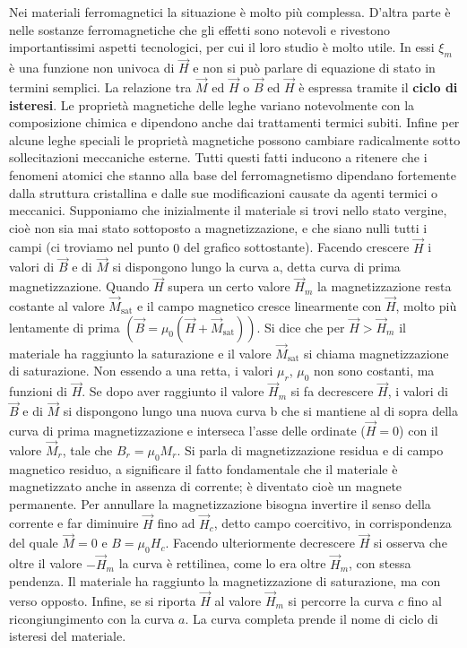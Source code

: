 Nei materiali ferromagnetici la situazione è molto più complessa. D'altra parte è nelle sostanze ferromagnetiche che gli effetti sono notevoli e rivestono importantissimi aspetti tecnologici, per cui il loro studio è molto utile. In essi $\xi_m$ è una funzione non univoca di $\vec{H}$ e non si può parlare di equazione di stato in termini semplici. La relazione tra $\vec{M}$ ed $\vec{H}$ o $\vec{B}$ ed $\vec{H}$ è espressa tramite il \textbf{ciclo di isteresi}. Le proprietà magnetiche delle leghe variano notevolmente con la composizione chimica e dipendono anche dai trattamenti termici subiti. Infine per alcune leghe speciali le proprietà magnetiche possono cambiare radicalmente sotto sollecitazioni meccaniche esterne. Tutti questi fatti inducono a ritenere che i fenomeni atomici che stanno alla base del ferromagnetismo dipendano fortemente dalla struttura cristallina e dalle sue modificazioni causate da agenti termici o meccanici. Supponiamo che inizialmente il materiale si trovi nello stato vergine, cioè non sia mai stato sottoposto a magnetizzazione, e che siano nulli tutti i campi (ci troviamo nel punto $0$ del grafico sottostante).
Facendo crescere $\vec{H}$ i valori di $\vec{B}$ e di $\vec{M}$ si dispongono lungo la curva a, detta curva di prima magnetizzazione. Quando $\vec{H}$ supera un certo valore $\vec{H}_m$ la magnetizzazione resta costante al valore $\vec{M}_{\text{sat}}$ e il campo magnetico cresce linearmente con $\vec{H}$, molto più lentamente di prima $(\vec{B} =\mu_0 (\vec{H} +\vec{M}_{\text{sat}}))$. Si dice che per $\vec{H}>\vec{H}_m$ il materiale ha raggiunto la saturazione e il valore $\vec{M}_{\text{sat}}$ si chiama magnetizzazione di saturazione. Non essendo a una retta, i valori $\mu_r$, $\mu_0$ non sono costanti, ma funzioni di $\vec{H}$. Se dopo aver raggiunto il valore $\vec{H}_m$ si fa decrescere $\vec{H}$, i valori di $\vec{B}$ e di $\vec{M}$ si dispongono lungo una nuova curva b che si mantiene al di sopra della curva di prima magnetizzazione e interseca l'asse delle ordinate ($\vec{H}=0$) con il valore $\vec{M}_r$, tale che $B_r=\mu_0 M_r$. Si parla di magnetizzazione residua e di campo magnetico residuo, a significare il fatto fondamentale che il materiale è magnetizzato anche in assenza di corrente; è diventato cioè un magnete permanente. Per annullare la magnetizzazione bisogna invertire il senso della corrente e far diminuire $\vec{H}$ fino ad $\vec{H}_c$, detto campo coercitivo, in corrispondenza del quale $\vec{M}=0$ e $B=\mu_0 H_c$.
Facendo ulteriormente decrescere $\vec{H}$ si osserva che oltre il valore $-\vec{H}_m$ la curva è rettilinea, come lo era oltre $\vec{H}_m$, con stessa pendenza. Il materiale ha raggiunto la magnetizzazione di saturazione, ma con verso opposto.
Infine, se si riporta $\vec{H}$ al valore $\vec{H}_m$ si percorre la curva $c$ fino al ricongiungimento con la curva $a$. La curva completa prende il nome di ciclo di isteresi del materiale.

